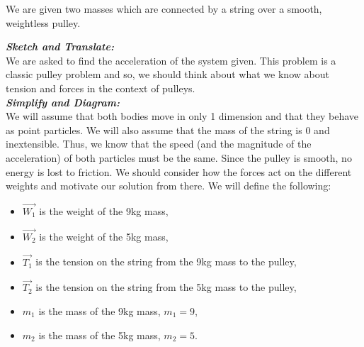 %
%
%


\begin{subquestions}
	
\subquestion

We are given two masses which are connected by a string over a smooth, weightless pulley.

\begin{subsubquestions}
	
\subsubquestion

\textbf{\textit{Sketch and Translate:}} \\
We are asked to find the acceleration of the system given. This problem is a classic pulley problem and so, we should think about what we know about tension and forces in the context of pulleys.\\




\textbf{\textit{Simplify and Diagram:}} \\
We will assume that both bodies move in only 1 dimension and that they behave as point particles. We will also assume that the mass of the string is 0 and inextensible. Thus, we know that the speed (and the magnitude of the acceleration) of both particles must be the same. Since the pulley is smooth, no energy is lost to friction. We should consider how the forces act on the different weights and motivate our solution from there.
We will define the following:
\begin{itemize}
	\item $\vec{W_1}$ is the weight of the 9kg mass,
	\item $\vec{W_2}$ is the weight of the 5kg mass,
	\item $\vec{T_1}$ is the tension on the string from the 9kg mass to the pulley,
	\item $\vec{T_2}$ is the tension on the string from the 5kg mass to the pulley,
	\item $m_1$ is the mass of the 9kg mass, $m_1=9$,
	\item $m_2$ is the mass of the 5kg mass, $m_2=5$.
\end{itemize}




\end{subsubquestions}
\end{subquestions}
